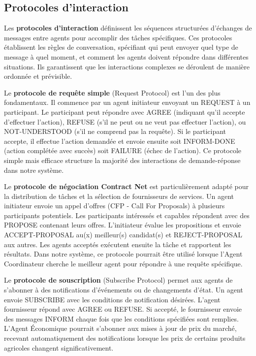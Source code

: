 \subsection{Protocoles d'interaction}

Les \textbf{protocoles d'interaction} définissent les séquences structurées d'échanges de messages entre agents pour accomplir des tâches spécifiques. Ces protocoles établissent les règles de conversation, spécifiant qui peut envoyer quel type de message à quel moment, et comment les agents doivent répondre dans différentes situations. Ils garantissent que les interactions complexes se déroulent de manière ordonnée et prévisible.

Le \textbf{protocole de requête simple} (Request Protocol) est l'un des plus fondamentaux. Il commence par un agent initiateur envoyant un REQUEST à un participant. Le participant peut répondre avec AGREE (indiquant qu'il accepte d'effectuer l'action), REFUSE (s'il ne peut ou ne veut pas effectuer l'action), ou NOT-UNDERSTOOD (s'il ne comprend pas la requête). Si le participant accepte, il effectue l'action demandée et envoie ensuite soit INFORM-DONE (action complétée avec succès) soit FAILURE (échec de l'action). Ce protocole simple mais efficace structure la majorité des interactions de demande-réponse dans notre système.

Le \textbf{protocole de négociation Contract Net} est particulièrement adapté pour la distribution de tâches et la sélection de fournisseurs de services. Un agent initiateur envoie un appel d'offres (CFP - Call For Proposals) à plusieurs participants potentiels. Les participants intéressés et capables répondent avec des PROPOSE contenant leurs offres. L'initiateur évalue les propositions et envoie ACCEPT-PROPOSAL au(x) meilleur(s) candidat(s) et REJECT-PROPOSAL aux autres. Les agents acceptés exécutent ensuite la tâche et rapportent les résultats. Dans notre système, ce protocole pourrait être utilisé lorsque l'Agent Coordinateur cherche le meilleur agent pour répondre à une requête spécifique.

Le \textbf{protocole de souscription} (Subscribe Protocol) permet aux agents de s'abonner à des notifications d'événements ou de changements d'état. Un agent envoie SUBSCRIBE avec les conditions de notification désirées. L'agent fournisseur répond avec AGREE ou REFUSE. Si accepté, le fournisseur envoie des messages INFORM chaque fois que les conditions spécifiées sont remplies. L'Agent Économique pourrait s'abonner aux mises à jour de prix du marché, recevant automatiquement des notifications lorsque les prix de certains produits agricoles changent significativement.

